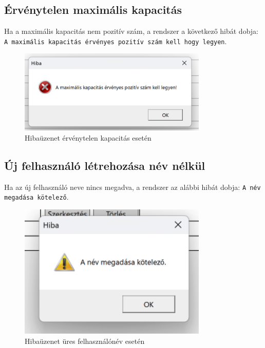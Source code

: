 \documentclass{report}[11pt]
\begin{document}
\subsection{Érvénytelen maximális kapacitás}
Ha a maximális kapacitás nem pozitív szám, a rendszer a következő hibát dobja: \texttt{A maximális kapacitás érvényes pozitív szám kell hogy legyen}.

\begin{figure}[H]
    \centering
    \includegraphics[width=0.8\textwidth]{figures/capacity_input_error.png}
    \caption{Hibaüzenet érvénytelen kapacitás esetén}
    \label{fig:invalid_capacity}
\end{figure}

\subsection{Új felhasználó létrehozása név nélkül}
Ha az új felhasználó neve nincs megadva, a rendszer az alábbi hibát dobja: \texttt{A név megadása kötelező}.

\begin{figure}[H]
    \centering
    \includegraphics[width=0.8\textwidth]{figures/name_not_input_error.png}
    \caption{Hibaüzenet üres felhasználónév esetén}
    \label{fig:missing_user_name}
\end{figure}
\end{document}
